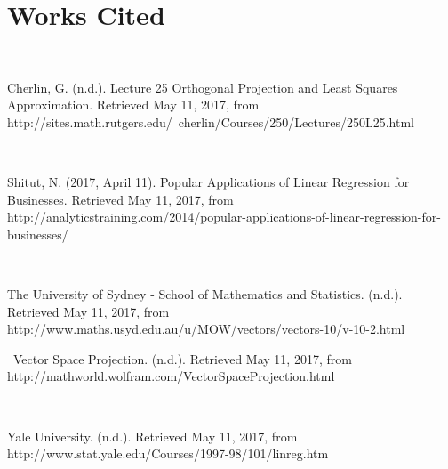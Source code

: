 \documentclass{article}
\begin{document}
\section{Works Cited}

\

Cherlin, G. (n.d.). Lecture 25 Orthogonal Projection and Least Squares Approximation. Retrieved May 11, 2017, from http://sites.math.rutgers.edu/~cherlin/Courses/250/Lectures/250L25.html

\

Shitut, N. (2017, April 11). Popular Applications of Linear Regression for Businesses. Retrieved May 11, 2017, from http://analyticstraining.com/2014/popular-applications-of-linear-regression-for-businesses/

\

The University of Sydney - School of Mathematics and Statistics. (n.d.). Retrieved May 11, 2017, from http://www.maths.usyd.edu.au/u/MOW/vectors/vectors-10/v-10-2.html

\
Vector Space Projection. (n.d.). Retrieved May 11, 2017, from http://mathworld.wolfram.com/VectorSpaceProjection.html


\

Yale University. (n.d.). Retrieved May 11, 2017, from http://www.stat.yale.edu/Courses/1997-98/101/linreg.htm
\end{document}
